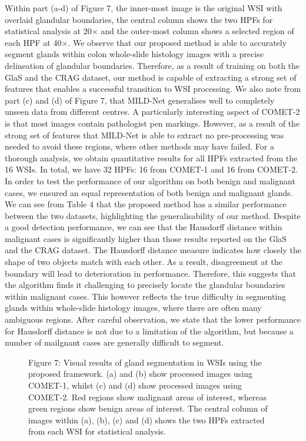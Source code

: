\documentclass[3p]{elsarticle}
\begin{document}
Within part (a-d) of Figure 7, the inner-most image is the original WSI with overlaid glandular boundaries, the central column shows the two HPFs for statistical analysis at 20$\times$ and the outer-most column shows a selected region of each HPF at 40$\times$. We observe that our proposed method is able to accurately segment glands within colon whole-slide histology images with a precise delineation of glandular boundaries. Therefore, as a result of training on both the GlaS and the CRAG dataset, our method is capable of extracting a strong set of features that enables a successful transition to WSI processing. We also note from part (c) and (d) of Figure 7, that MILD-Net generalises well to completely unseen data from different centres. A particularly interesting aspect of COMET-2 is that most images contain pathologist pen markings. However, as a result of the strong set of features that MILD-Net is able to extract no pre-processing was needed to avoid these regions, where other methods may have failed. For a thorough analysis, we obtain quantitative results for all HPFs extracted from the 16 WSIs. In total, we have 32 HPFs: 16 from COMET-1 and 16 from COMET-2. In order to test the performance of our algorithm on both benign and malignant cases, we ensured an equal representation of both benign and malignant glands. We can see from Table 4 that the proposed method has a similar performance between the two datasets, highlighting the generalisability of our method. Despite a good detection performance, we can see that the Hausdorff distance within malignant cases is significantly higher than those results reported on the GlaS and the CRAG dataset. The Hausdorff distance measure indicates how closely the shape of two objects match with each other. As a result, disagreement at the boundary will lead to deterioration in performance. Therefore, this suggests that the algorithm finds it challenging to precisely locate the glandular boundaries within malignant cases. This however reflects the true difficulty in segmenting glands within whole-slide histology images, where there are often many ambiguous regions. After careful observation, we state that the lower performance for Hausdorff distance is not due to a limitation of the algorithm, but because a number of mailgnant cases are generally difficult to segment. 
\begin{figure}[h!]
\centering
\captionsetup[subfigure]{labelformat=empty}
\caption*{Figure 7: Visual results of gland segmentation in WSIs using the proposed framework. (a) and (b) show processed images using COMET-1, whilst (c) and (d) show processed images using COMET-2. Red regions show malignant areas of interest, whereas green regions show benign areas of interest. The central column of images within (a), (b), (c) and (d) shows the two HPFs extracted from each WSI for statistical analysis.}
\end{figure}
\end{document}
